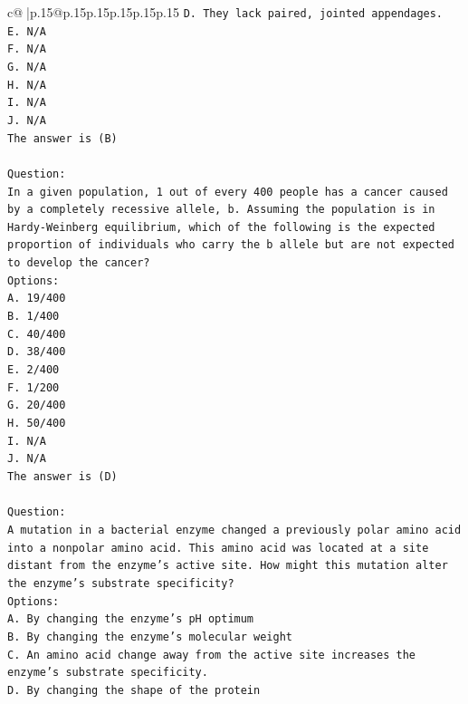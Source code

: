 \documentclass{article}
\begin{document}
{\begin{supertabular}{c@{$\;$}|p{.15\linewidth}@{}p{.15\linewidth}p{.15\linewidth}p{.15\linewidth}p{.15\linewidth}p{.15\linewidth}}
{{{\texttt{D. They lack paired, jointed appendages.} \\
\texttt{E. N/A} \\
\texttt{F. N/A} \\
\texttt{G. N/A} \\
\texttt{H. N/A} \\
\texttt{I. N/A} \\
\texttt{J. N/A} \\
\texttt{The answer is (B)} \\
\\ 
\texttt{Question:} \\
\texttt{In a given population, 1 out of every 400 people has a cancer caused by a completely recessive allele, b. Assuming the population is in Hardy{-}Weinberg equilibrium, which of the following is the expected proportion of individuals who carry the b allele but are not expected to develop the cancer?} \\
\texttt{Options:} \\
\texttt{A. 19/400} \\
\texttt{B. 1/400} \\
\texttt{C. 40/400} \\
\texttt{D. 38/400} \\
\texttt{E. 2/400} \\
\texttt{F. 1/200} \\
\texttt{G. 20/400} \\
\texttt{H. 50/400} \\
\texttt{I. N/A} \\
\texttt{J. N/A} \\
\texttt{The answer is (D)} \\
\\ 
\texttt{Question:} \\
\texttt{A mutation in a bacterial enzyme changed a previously polar amino acid into a nonpolar amino acid. This amino acid was located at a site distant from the enzyme’s active site. How might this mutation alter the enzyme’s substrate specificity?} \\
\texttt{Options:} \\
\texttt{A. By changing the enzyme’s pH optimum} \\
\texttt{B. By changing the enzyme's molecular weight} \\
\texttt{C. An amino acid change away from the active site increases the enzyme's substrate specificity.} \\
\texttt{D. By changing the shape of the protein} \\
}}}
\end{supertabular}}
\end{document}
